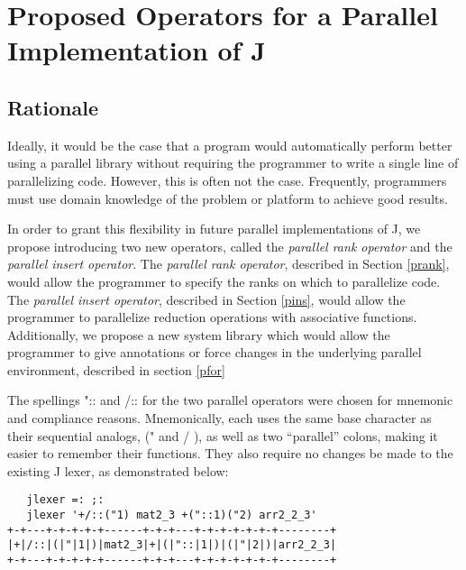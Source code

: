 \chapter{Proposed Operators for a Parallel Implementation of J} %
\label{paraop}

\section{Rationale}
Ideally, it would be the case that a program would automatically perform better using a parallel library 
without requiring the programmer to write a single line of parallelizing code. 
However, this is often not the case. %
Frequently, programmers must use domain knowledge of the problem or platform to achieve good results. 

In order to grant this flexibility in future parallel implementations of J, 
we propose introducing two new operators, called the \textit{parallel rank operator} 
and the \textit{parallel insert operator}.
The \textit{parallel rank operator}, described in Section \ref{prank}, 
would allow the programmer to specify the ranks on which to parallelize code.
The \textit{parallel insert operator}, described in Section \ref{pins}, 
would allow the programmer to parallelize reduction operations with associative functions.
Additionally, we propose a new system library
which would allow the programmer to give annotations or force changes in the underlying parallel environment,
described in section \ref{pfor}

The spellings \ttfamily ":: \normalfont and \ttfamily /:: \normalfont for the two parallel operators were chosen for mnemonic and compliance reasons.
Mnemonically, each uses the same base character as their sequential analogs, (\ttfamily " \normalfont and \ttfamily / \normalfont), 
as well as two ``parallel'' colons, making it easier to remember their functions.
They also require no changes be made to the existing J lexer\cite{ioj}, 
as demonstrated below:

\begin{singlespacing}
\begin{small}
\begin{verbatim}
   jlexer =: ;:
   jlexer '+/::("1) mat2_3 +("::1)("2) arr2_2_3'
+-+---+-+-+-+-+------+-+-+---+-+-+-+-+-+-+--------+
|+|/::|(|"|1|)|mat2_3|+|(|"::|1|)|(|"|2|)|arr2_2_3|
+-+---+-+-+-+-+------+-+-+---+-+-+-+-+-+-+--------+
\end{verbatim}
\end{small}
\end{singlespacing}

